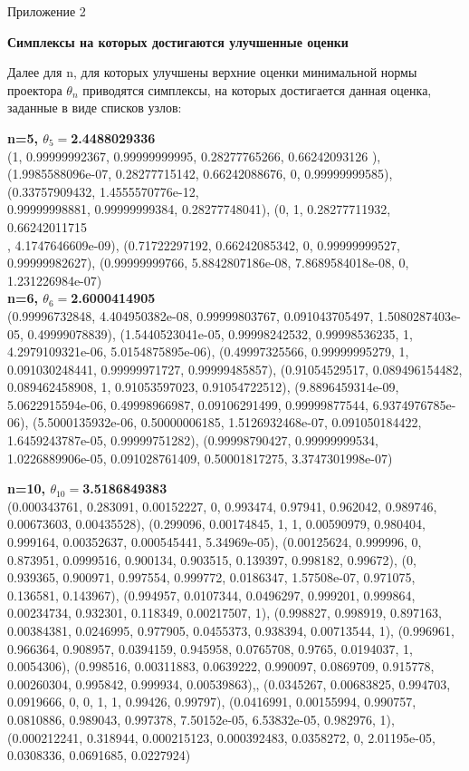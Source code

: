 \documentclass[12pt, a4paper]{extarticle}
\begin{document}
\newpage
\begin{flushright}
Приложение 2
\end{flushright}
\begin{center}
	{\bf Симплексы на которых достигаются улучшенные оценки}
\end{center}
Далее для n, для которых улучшены верхние оценки минимальной нормы проектора $\theta_n$ приводятся симплексы, на которых достигается данная оценка, заданные в виде  списков узлов:
\begin{center}
{\bf\boldmath n=5, $\theta_{5}=$2.4488029336}\\
(1, 0.99999992367, 0.99999999995, 0.28277765266, 0.66242093126 ),
(1.9985588096e-07, 0.28277715142, 0.66242088676, 0, 0.99999999585),
(0.33757909432, 1.4555570776e-12,\\ 0.99999998881, 0.99999999384, 0.28277748041),
(0, 1, 0.28277711932, 0.66242011715\\, 4.1747646609e-09),
(0.71722297192, 0.66242085342, 0, 0.99999999527, 0.99999982627),
(0.99999999766, 5.8842807186e-08, 7.8689584018e-08, 0, 1.231226984e-07) \\

{\bf\boldmath n=6, $\theta_{6}=$2.6000414905}\\
(0.99996732848, 4.404950382e-08, 0.99999803767, 0.091043705497, 1.5080287403e-05, 0.49999078839),
(1.5440523041e-05, 0.99998242532, 0.99998536235, 1, 4.2979109321e-06, 5.0154875895e-06),
(0.49997325566, 0.99999995279, 1, 0.091030248441, 0.99999971727, 0.99999485857),
(0.91054529517, 0.089496154482, 0.089462458908, 1, 0.91053597023, 0.91054722512),
(9.8896459314e-09, 5.0622915594e-06, 0.49998966987, 0.09106291499, 0.99999877544, 6.9374976785e-06),
(5.5000135932e-06, 0.50000006185, 1.5126932468e-07, 0.091050184422, 1.6459243787e-05, 0.99999751282),
(0.99998790427, 0.99999999534, 1.0226889906e-05, 0.091028761409, 0.50001817275, 3.3747301998e-07)

{\bf\boldmath n=10, $\theta_{10}=$3.5186849383}\\
(0.000343761, 0.283091, 0.00152227, 0, 0.993474, 0.97941, 0.962042, 0.989746, 0.00673603, 0.00435528),
(0.299096, 0.00174845, 1, 1, 0.00590979, 0.980404, 0.999164, 0.00352637, 0.000545441, 5.34969e-05),
(0.00125624, 0.999996, 0, 0.873951, 0.0999516, 0.900134, 0.903515, 0.139397, 0.998182, 0.99672),
(0, 0.939365, 0.900971, 0.997554, 0.999772, 0.0186347, 1.57508e-07, 0.971075, 0.136581, 0.143967),
(0.994957, 0.0107344, 0.0496297, 0.999201, 0.999864, 0.00234734, 0.932301, 0.118349, 0.00217507, 1),
(0.998827, 0.998919, 0.897163, 0.00384381, 0.0246995, 0.977905, 0.0455373, 0.938394, 0.00713544, 1),
(0.996961, 0.966364, 0.908957, 0.0394159, 0.945958, 0.0765708, 0.9765, 0.0194037, 1, 0.0054306),
(0.998516, 0.00311883, 0.0639222, 0.990097, 0.0869709, 0.915778, 0.00260304, 0.995842, 0.999934, 0.00539863),, 
(0.0345267, 0.00683825, 0.994703, 0.0919666, 0, 0, 1, 1, 0.99426, 0.99797),
(0.0416991, 0.00155994, 0.990757, 0.0810886, 0.989043, 0.997378, 7.50152e-05, 6.53832e-05, 0.982976, 1),
(0.000212241, 0.318944, 0.000215123, 0.000392483, 0.0358272, 0, 2.01195e-05, 0.0308336, 0.0691685, 0.0227924)


\end{center}
\end{document}
